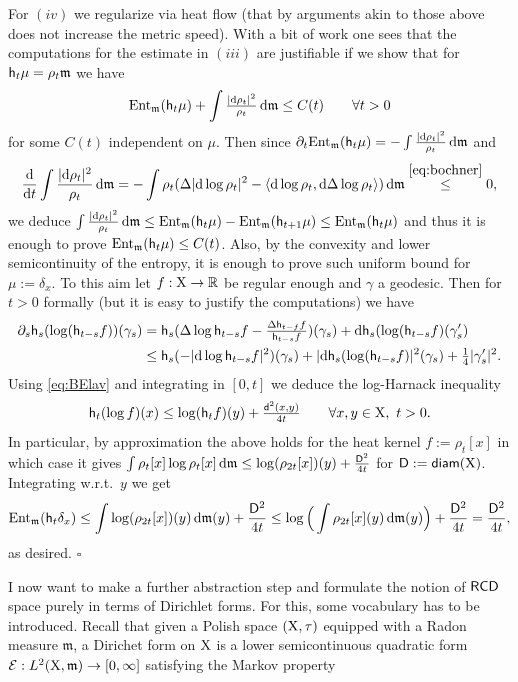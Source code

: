 \documentclass[11pt]{article}
\numberwithin{equation}{section}
\newenvironment{idea}{\removelastskip\par\medskip   %
\noindent{\em Idea of the proof} \rm}{\penalty-20\null\hfill$\square$\par\medbreak}
\newcommand{\R}{\mathbb{R}}
\newcommand{\X}{{\rm X}}
\newcommand{\sfd}{{\sf d}}
\newcommand{\diam}{{\sf diam}}
\newcommand{\mm}{{\mathfrak m}}
\newcommand{\RCD}{{\sf RCD}}
\newcommand{\ent}{{\rm Ent}_\mm}
\renewcommand{\d}{{\rm d}}
\newcommand{\h}{{\sf h}} %
\newcommand\la{\langle}
\newcommand\ra{\rangle}
\begin{document}
\begin{idea}
For $(iv)$  we regularize via heat flow (that by arguments akin to those above does not increase the metric speed). With a bit of work one sees that the computations for the estimate in $(iii)$ are justifiable if we show that for $\h_t\mu=\rho_t\mm$ we have
\begin{equation}
\label{eq:apriorical}
\ent(\h_t\mu)+\int\tfrac{|\d\rho_t |^2}{\rho_t}\,\d\mm \leq C(t)\qquad\forall t>0
\end{equation}
for some $C(t)$ independent on $\mu$. Then  since  $\partial_t\ent(\h_t\mu)=-\int\tfrac{|\d\rho_t|^2}{\rho_t}\,\d\mm$ and 
\[
\frac\d{\d t} \int\frac{|\d\rho_t|^2}{\rho_t}\,\d\mm=-\int\rho_t(\Delta|\d\log\rho_t|^2-\la\d\log\rho_t,\d\Delta\log\rho_t\ra)\,\d\mm\stackrel{\eqref{eq:bochner}}\leq 0,
\]
we deduce $\int\tfrac{|\d\rho_t|^2}{\rho_t}\,\d\mm\leq {\ent(\h_t\mu)-\ent(\h_{t+1}\mu)}\leq \ent(\h_t\mu)$ and thus it is enough to prove  $\ent(\h_t\mu)\leq C(t)$. Also, by the convexity and lower semicontinuity of the entropy, it is enough to prove such uniform bound for $\mu:=\delta_x$. To this aim let $f:\X\to\R$ be regular enough and $\gamma$ a geodesic. Then for $t>0$ formally (but it is easy to justify the computations) we have
\[
\begin{split}
\partial_s\h_s(\log(\h_{t-s}f))(\gamma_s)&=\h_s(\Delta \log\h_{t-s}f-\tfrac{\Delta \h_{t-f}f}{\h_{t-s}f})(\gamma_s)+\d\h_s(\log(\h_{t-s}f)(\gamma'_s)\\
&\leq \h_s(-|\d\log\h_{t-s}f|^2)(\gamma_s)+|\d\h_s(\log(\h_{t-s}f)|^2(\gamma_s)+\tfrac14|\gamma_s'|^2.
\end{split}
\]
Using \eqref{eq:BElav} and integrating in $[0,t]$ we deduce the log-Harnack inequality
\[
\h_t(\log f)(x)\leq\log(\h_tf)(y)+\tfrac{\sfd^2(x,y)}{4t}\qquad\forall x,y\in\X,\ t>0.
\]
In particular, by approximation the above holds for the heat kernel $f:=\rho_t[x]$ in which case it gives  $\int\rho_t[x]\log\rho_t[x]\,\d\mm\leq \log(\rho_{2t}[x])(y)+\frac{{\sf D}^2}{4t}$ for ${\sf D}:=\diam(\X)$. Integrating w.r.t.\ $y$ we get
\[
\ent(\h_t\delta_x)\leq \int \log(\rho_{2t}[x])(y)\,\d\mm(y)+\frac{{\sf D}^2}{4t}\leq \log\Big(\int \rho_{2t}[x](y)\,\d\mm(y)\Big)+\frac{{\sf D}^2}{4t}=\frac{{\sf  D}^2}{4t} ,
\]
as desired.
\end{idea}
I now want to make a further abstraction step and formulate the notion of $\RCD$ space purely in terms of Dirichlet forms.  For this, some vocabulary has to be introduced. Recall that given a Polish space $(\X,\tau)$ equipped with a Radon measure $\mm$, a  Dirichet form on $\X$ is a lower semicontinuous quadratic form $\mathcal E:L^2(\X,\mm)\to[0,\infty]$ satisfying the Markov property
\end{document}
